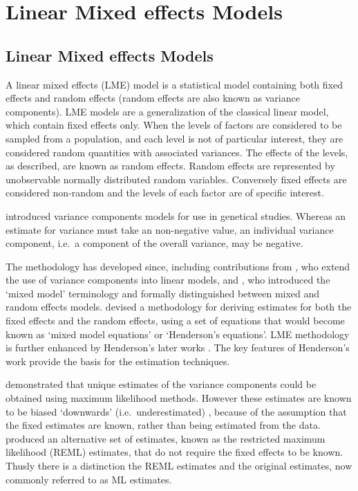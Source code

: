 \documentclass[12pt, a4paper]{report}
\theoremstyle{plain}
\theoremstyle{definition}
\theoremstyle{remark}
\begin{document}


\chapter{Linear Mixed effects Models}
\section{Linear Mixed effects Models}
A linear mixed effects (LME) model is a statistical model containing both fixed effects and random effects (random effects are also known as variance components). LME models are a generalization of the classical linear model, which contain fixed effects only. When the levels of factors are considered to be sampled from a population,
and each level is not of particular interest, they are considered random quantities with associated variances.
The effects of the levels, as described, are known as random effects. Random effects are represented by unobservable
normally distributed random variables. Conversely fixed effects are considered non-random and the
levels of each factor are of specific interest.

\citet{Fisher4} introduced variance components models for use in genetical studies. Whereas an estimate for variance must take an non-negative value, an individual variance component, i.e.\ a component of the overall variance, may be negative.

The methodology has developed since, including contributions from
\citet{tippett}, who extend the use of variance components into linear models, and \citet{eisenhart}, who introduced the `mixed model' terminology and formally distinguished between mixed and random effects models. \citet{Henderson:1950} devised a methodology for deriving estimates for both the fixed effects and the random effects, using a set of equations that would become known as `mixed model equations' or `Henderson's equations'.
LME methodology is further enhanced by Henderson's later works \citep{Henderson53, Henderson59,Henderson63,Henderson73,Henderson84a}. The key features of Henderson's work provide the basis for the estimation techniques.

\citet{HartleyRao} demonstrated that unique estimates of the variance components could be obtained using maximum likelihood methods. However these estimates are known to be biased `downwards' (i.e.\ underestimated) , because of the assumption that the fixed estimates are known, rather than being estimated from the data. \citet{PattersonThompson} produced an alternative set of estimates, known as the restricted maximum likelihood (REML) estimates, that do not require the fixed effects to be known. Thusly there is a distinction the REML estimates and the original estimates, now commonly referred to as ML estimates.
\end{document}
